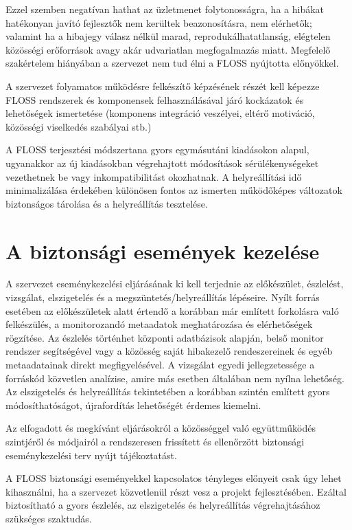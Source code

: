 \documentclass[12pt,magyar,a4paper,oneside]{scrreprt}
\begin{document}
Ezzel szemben negatívan hathat az üzletmenet folytonosságra, ha a
hibákat hatékonyan javító fejlesztők nem kerültek beazonosításra, nem
elérhetők; valamint ha a hibajegy válasz nélkül marad,
reprodukálhatatlanság, elégtelen közösségi erőforrások avagy akár
udvariatlan megfogalmazás miatt. Megfelelő szakértelem hiányában a
szervezet nem tud élni a FLOSS nyújtotta előnyökkel.

A szervezet folyamatos működésre felkészítő képzésének részét kell
képezze FLOSS rendszerek és komponensek felhasználásával járó kockázatok
és lehetőségek ismertetése (komponens integráció veszélyei, eltérő
motiváció, közösségi viselkedés szabályai stb.)

A FLOSS terjesztési módszertana gyors egymásutáni kiadásokon alapul,
ugyanakkor az új kiadásokban végrehajtott módosítások sérülékenységeket
vezethetnek be vagy inkompatibilitást okozhatnak. A helyreállítási idő
minimalizálása érdekében különösen fontos az ismerten működőképes
változatok biztonságos tárolása és a helyreállítás tesztelése.

\hypertarget{a-biztonsuxe1gi-esemuxe9nyek-kezeluxe9se}{%
\section{A biztonsági események
kezelése}\label{a-biztonsuxe1gi-esemuxe9nyek-kezeluxe9se}}

A szervezet eseménykezelési eljárásának ki kell terjednie az
előkészület, észlelést, vizsgálat, elszigetelés és a
megszüntetés/helyreállítás lépéseire. Nyílt forrás esetében az
előkészületek alatt értendő a korábban már említett forkolásra való
felkészülés, a monitorozandó metaadatok meghatározása és elérhetőségek
rögzítése. Az észlelés történhet központi adatbázisok alapján, belső
monitor rendszer segítségével vagy a közösség saját hibakezelő
rendeszereinek és egyéb metaadatainak direkt megfigyelésével. A
vizsgálat egyedi jellegzetessége a forráskód közvetlen analízise, amire
más esetben általában nem nyílna lehetőség. Az elszigetelés és
helyreállítás tekintetében a korábban szintén említett gyors
módosíthatóságot, újrafordítás lehetőségét érdemes kiemelni.

Az elfogadott és megkívánt eljárásokról a közösséggel való együttműködés
szintjéről és módjairól a rendszeresen frissített és ellenőrzött
biztonsági eseménykezelési terv nyújt tájékoztatást.

A FLOSS biztonsági eseményekkel kapcsolatos tényleges előnyeit csak úgy
lehet kihasználni, ha a szervezet közvetlenül részt vesz a projekt
fejlesztésében. Ezáltal biztosítható a gyors észlelés, az elszigetelés
és helyreállítás végrehajtásához szükséges szaktudás.
\end{document}
